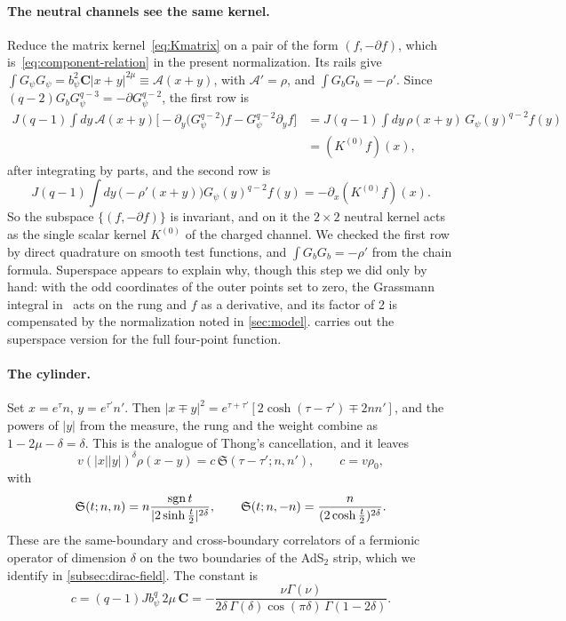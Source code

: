 \paragraph{The neutral channels see the same kernel.} Reduce the matrix kernel~\eqref{eq:Kmatrix} on a pair of the form $(f,-\partial f)$, which is~\eqref{eq:component-relation} in the present normalization. Its rails give $\int G_\psi G_\psi=b_\psi^2\mathbf C|x+y|^{2\mu}\equiv\mathcal A(x+y)$, with $\mathcal A'=\rho$, and $\int G_bG_b=-\rho'$. Since $(q-2)G_bG_\psi^{q-3}=-\partial G_\psi^{q-2}$, the first row is
\begin{equation}
\begin{aligned}
J(q-1)\int dy\,\mathcal A(x+y)\Big[-\partial_y\big(G_\psi^{q-2}\big)f-G_\psi^{q-2}\partial_yf\Big]&=J(q-1)\int dy\,\rho(x+y)\,G_\psi(y)^{q-2}f(y)\\
&=(K^{(0)}f)(x),
\end{aligned}
\end{equation}
after integrating by parts, and the second row is
\begin{equation}
J(q-1)\int dy\,\big(-\rho'(x+y)\big)G_\psi(y)^{q-2}f(y)=-\partial_x(K^{(0)}f)(x).
\end{equation}
So the subspace $\{(f,-\partial f)\}$ is invariant, and on it the $2\times2$ neutral kernel acts as the single scalar kernel $K^{(0)}$ of the charged channel. We checked the first row by direct quadrature on smooth test functions, and $\int G_bG_b=-\rho'$ from the chain formula. Superspace appears to explain why, though this step we did only by hand: with the odd coordinates of the outer points set to zero, the Grassmann integral in~\cite[(4.42)]{Bulycheva:2018qcp} acts on the rung and $f$ as a derivative, and its factor of 2 is compensated by the normalization noted in \cref{sec:model}.  carries out the superspace version for the full four-point function.

\paragraph{The cylinder.} Set $x=e^\tau n$, $y=e^{\tau'}n'$. Then $|x\mp y|^2=e^{\tau+\tau'}[2\cosh(\tau-\tau')\mp2nn']$, and the powers of $|y|$ from the measure, the rung and the weight combine as $1-2\mu-\delta=\delta$. This is the analogue of Thong's cancellation, and it leaves
\begin{equation}\label{eq:S-kernel}
v(|x||y|)^\delta\rho(x-y)=c\,\mathfrak S(\tau-\tau';n,n'),\qquad c=v\rho_0,
\end{equation}
with
\begin{equation}\label{eq:S}
\mathfrak S(t;n,n)=n\frac{\operatorname{sgn} t}{|2\sinh\frac t2|^{2\delta}},\qquad\mathfrak S(t;n,-n)=\frac{n}{(2\cosh\frac t2)^{2\delta}}.
\end{equation}
These are the same-boundary and cross-boundary correlators of a fermionic operator of dimension $\delta$ on the two boundaries of the AdS$_2$ strip, which we identify in \cref{subsec:dirac-field}. The constant is
\begin{equation}\label{eq:c}
c=(q-1)Jb_\psi^q\,2\mu\,\mathbf C=-\frac{\nu\Gamma(\nu)}{2\delta\,\Gamma(\delta)\cos(\pi\delta)\,\Gamma(1-2\delta)}.
\end{equation}

